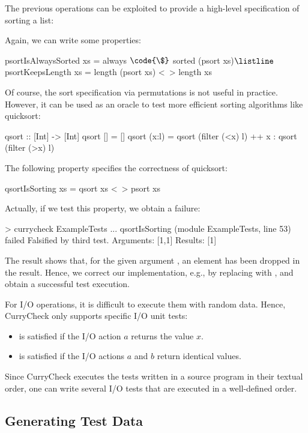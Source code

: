 %
The previous operations can be exploited to provide
a high-level specification of sorting a list:
\begin{curry}
psort :: [Int] -> [Int}
psort xs | sorted ys = ys
 where ys = perm xs
\end{curry}
Again, we can write some properties:
\begin{curry}
psortIsAlwaysSorted xs = always $\code{\$}$ sorted (psort xs)$\listline$
psortKeepsLength xs = length (psort xs) <~> length xs
\end{curry}
Of course, the sort specification via permutations is not useful
in practice. However, it can be used as an oracle to test
more efficient sorting algorithms like quicksort:
\begin{curry}
qsort :: [Int] -> [Int] 
qsort []     = []
qsort (x:l)  = qsort (filter (<x) l) ++ x : qsort (filter (>x) l)
\end{curry}
The following property specifies the correctness of quicksort:
\begin{curry}
qsortIsSorting xs = qsort xs <~> psort xs
\end{curry}
Actually, if we test this property, we obtain a failure:
%
\begin{curry}
> currycheck ExampleTests
...
qsortIsSorting (module ExampleTests, line 53) failed
Falsified by third test.
Arguments:
[1,1]
Results:
[1]
\end{curry}
%
The result shows that, for the given argument \code{[1,1]},
an element has been dropped in the result.
Hence, we correct our implementation, e.g., by replacing
 with , and obtain a successful test execution.

For I/O operations, it is difficult to execute them with random data.
Hence, CurryCheck only supports specific I/O unit tests:
\begin{itemize}
\item {} is satisfied if the I/O action $a$
returns the value $x$.
\item {} is satisfied if the I/O actions
$a$ and $b$ return identical values.
\end{itemize}
%
Since CurryCheck executes the tests written in a source program
in their textual order, one can write several I/O tests that are
executed in a well-defined order.


\subsection{Generating Test Data}

